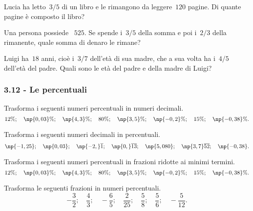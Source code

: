 \begin{esercizio}[\Ast]
 \label{ese:3.79}
Lucia ha letto~$3/5$ di un libro e le rimangono da leggere~$120$ pagine. Di quante pagine è composto il libro?
\end{esercizio}

\begin{esercizio}
 \label{ese:3.80}
Una persona possiede \officialeuro~$525$. Se spende i~$3/5$ della somma e poi i~$2/3$ della rimanente,
quale somma di denaro le rimane?
\end{esercizio}

\begin{esercizio}
 \label{ese:3.81}
Luigi ha~$18$ anni, cioè i~$3/7$ dell'età di sua madre, che a sua volta ha i~$4/5$ dell'età
del padre. Quali sono le età del padre e della madre di Luigi?
\end{esercizio}

\subsubsection*{3.12 - Le percentuali}

\begin{esercizio}
 \label{ese:3.82}
Trasforma i seguenti numeri percentuali in numeri decimali.
\[12\%;\quad \np{0,03}\%;\quad \np{4,3}\%;\quad 80\%;\quad \np{3,5}\%;\quad\np{-0,2}\%;\quad 15\%;\quad\np{-0,38}\%.\]
\end{esercizio}

\begin{esercizio}
 \label{ese:3.83}
Trasforma i seguenti numeri decimali in percentuali.
\[\np{-1,25};\quad \np{0,03};\quad \np{-2,}\overline{1};\quad \np{0,}\overline{13};\quad \np{5,080};\quad \np{3,7}\overline{52};\quad \np{-0,38}.\]
\end{esercizio}

\begin{esercizio}
 \label{ese:3.84}
Trasforma i seguenti numeri percentuali in frazioni ridotte ai minimi termini.
\[12\%;\quad \np{0,03}\%;\quad \np{4,3}\%;\quad 80\%;\quad \np{3,5}\%;\quad \np{-0,2}\%;\quad 15\%;\quad\np{-0,38}\%.\]
\end{esercizio}

\begin{esercizio}
\label{ese:3.85}
Trasforma le seguenti frazioni in numeri percentuali.
\[-\frac{3}{2};\quad\frac{4}{3};\quad-\frac{6}{5};\quad\frac{2}{25};\quad\frac{5}{8};
\quad\frac{5}{6};\quad-\frac{5}{12}.\]
\end{esercizio}

